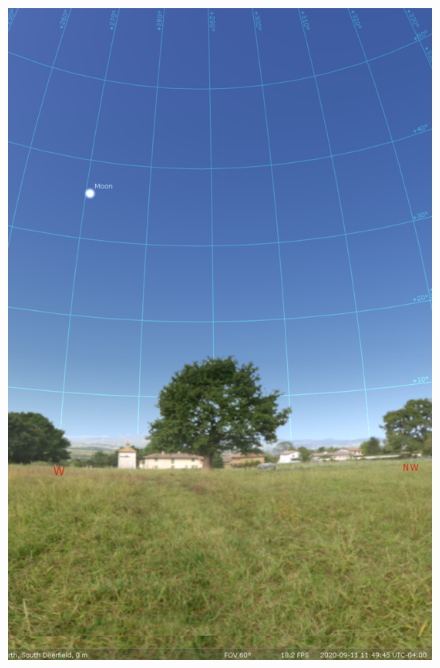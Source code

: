 \documentclass[main.tex]{subfiles}
\begin{document}
\begin{figure}[htbp]
\begin{center}
\begin{minipage}{0.3\textwidth}
	\includegraphics[width=\textwidth]{moonproj_stel.png}
    \end{minipage}
	\begin{minipage}{0.3\textwidth}
	\centering

\end{minipage}
\end{center}
\end{figure}
\end{document}
